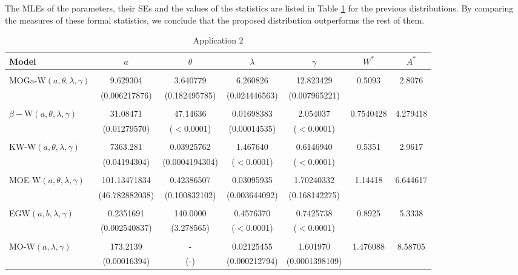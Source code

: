 \documentclass[twoside,leqno,11pt]{article}
\begin{document}
The MLEs of the parameters, their SEs and the values of the statistics are
listed in Table \ref{tab-ex2} for the previous distributions. By comparing the measures of these formal statistics,
we conclude that the proposed distribution outperforms the rest of them.

\begin{table}[htb!]
\scriptsize
\center
\caption{  \small Application 2}
\label{tab-ex2}
\begin{tabular}{lcccccc}
\hline\noalign{\smallskip}
Model & $a$ & $\theta$ & $\lambda$ & $\gamma$ &  $W^*$ & $A^*$   \\
\hline
 & & & & &  \\
MOGa-W$(a,\theta,\lambda,\gamma)$    &  9.629304 & 3.640779 & 6.260826 & 12.823429 &0.5093&  2.8076 \\
                                       &    (0.006217876) & (0.182495785) & (0.024446563) & (0.007965221)  && \\

 & & & & &  \\
 $\beta-$W$(a,\theta,\lambda,\gamma)$ &   31.08471 &  47.14636 &   0.01698383 &  2.054037 & 0.7540428 & 4.279418\\
&    (0.01279570) & ($<$0.0001) & (0.00014535) & ($<$0.0001)  && \\

 & & & & &  \\
KW-W$(a,\theta,\lambda,\gamma)$ &   7363.281 & 0.03925762 &  1.467640 &   0.6146940 & 0.5351 & 2.9617\\
                                       &    (0.04194304) & (0.0004194304)& ($<$0.0001)& ($<$0.0001) && \\

 & & & & &  \\
 MOE-W$(a,\theta,\lambda,\gamma)$  &  101.13471834 &  0.42386507  & 0.03095935 &  1.70240332  &1.14418 & 6.644617 \\
                            & (46.782882038) &  (0.100832102) &  (0.003644092) &  (0.168142275)   &  & \\

 & & & & &  \\
 EGW$(a,b,\lambda,\gamma)$    &  0.2351691 &  140.0000 &   0.4576370 &   0.7425738 &  0.8925 & 5.3338 \\
                            & (0.002540837) & (3.278565) & ($<$0.0001) & ($<$0.0001)   &  & \\

 & & & & &  \\
 MO-W$(a,\lambda,\gamma)$  & 173.2139  & - &  0.02125455 &  1.601970  &  1.476088   & 8.58705\\
                                       &    (0.00016394) & (-) & (0.000212794) & (0.0001398109)  &  & \\


\end{tabular}
\end{table}
\end{document}
